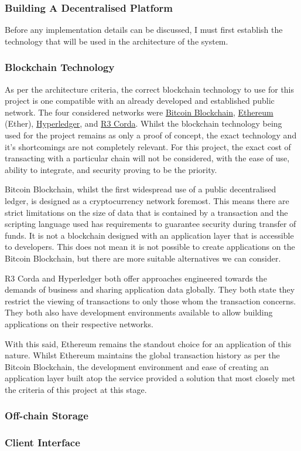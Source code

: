 \subsubsection{Building A Decentralised Platform}

Before any implementation details can be discussed, I must first establish the technology that will be used in the architecture of the system.

\subsubsection{Blockchain Technology}

As per the architecture criteria, the correct blockchain technology to use for this project is one compatible with an already developed and established public network. The four considered networks were \href{https://bitcoin.org/en/}{Bitcoin Blockchain}, \href{https://www.ethereum.org/}{Ethereum} (Ether), \href{https://www.hyperledger.org/}{Hyperledger}, and \href{https://www.corda.net/}{R3 Corda}. Whilst the blockchain technology being used for the project remains as only a proof of concept, the exact technology and it's shortcomings are not completely relevant. For this project, the exact cost of transacting with a particular chain will not be considered, with the ease of use, ability to integrate, and security proving to be the priority.

Bitcoin Blockchain, whilst the first widespread use of a public decentralised ledger, is designed as a cryptocurrency network foremost. This means there are strict limitations on the size of data that is contained by a transaction and the scripting language used has requirements to guarantee security during transfer of funds. It is not a blockchain designed with an application layer that is accessible to developers. This does not mean it is not possible to create applications on the Bitcoin Blockchain, but there are more suitable alternatives we can consider.

R3 Corda and Hyperledger both offer approaches engineered towards the demands of business and sharing application data globally. They both state they restrict the viewing of transactions to only those whom the transaction concerns. They both also have development environments available to allow building applications on their respective networks. 

With this said, Ethereum remains the standout choice for an application of this nature. Whilst Ethereum maintains the global transaction history as per the Bitcoin Blockchain, the development environment and ease of creating an application layer built atop the service provided a solution that most closely met the criteria of this project at this stage.

\subsubsection{Off-chain Storage}



\subsubsection{Client Interface}



